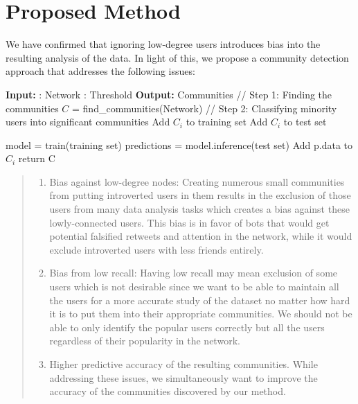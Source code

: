 \vspace{-1pt}
\section{Proposed Method}
We have confirmed that ignoring low-degree users introduces bias into the resulting analysis of the data. In light of this, we propose a community detection approach that addresses the following issues:
\begin{algorithm}[H]
\caption{CLAN}
\begin{algorithmic} 
\STATE \textbf{Input:}
: Network
: Threshold
\STATE \textbf{Output:} Communities
\STATE  // Step 1: Finding the communities
\STATE $C$ = find\_communities(Network)
\STATE // Step 2: Classifying minority users into significant communities
\STATE Add $C_i$ to training set
\ELSE
\STATE Add $C_i$ to test set
\ENDIF

\STATE model = train(training set)
\ENDFOR
\STATE predictions = model.inference(test set)
\STATE Add p.data to $C_i$
\ENDIF
\ENDFOR
\STATE return C
\end{algorithmic}
\end{algorithm}
\begin{quote}
\begin{enumerate}
\item Bias against low-degree nodes: Creating numerous small communities from putting introverted users in them results in the exclusion of those users from many data analysis tasks which creates a bias against these lowly-connected users. This bias is in favor of bots that would get potential falsified retweets and attention in the network, while it would exclude introverted users with less friends entirely.
\item Bias from low recall: Having low recall may mean exclusion of some users which is not desirable since we want to be able to maintain all the users for a more accurate study of the dataset no matter how hard it is to put them into their appropriate communities. We should not be able to only identify the popular users correctly but all the users regardless of their popularity in the network.
\item Higher predictive accuracy of the resulting communities. While addressing these issues, we simultaneously want to improve the accuracy of the communities discovered by our method. %
\end{enumerate}
\end{quote}
